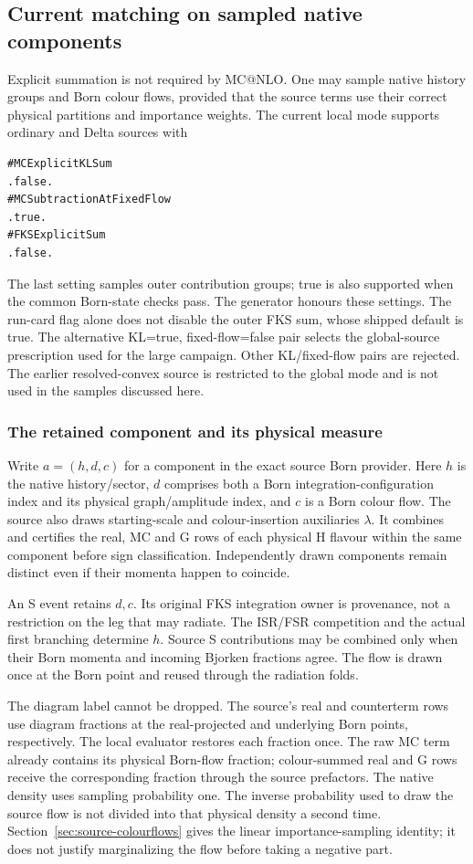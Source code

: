 \subsection{Current matching on sampled native components}
\label{sec:delta-sampled}

Explicit summation is not required by MC@NLO. One may sample native
history groups and Born colour flows, provided that the source terms
use their correct physical partitions and importance weights. The
current local mode supports ordinary and Delta sources with
\begin{verbatim}
#MCExplicitKLSum
.false.
#MCSubtractionAtFixedFlow
.true.
#FKSExplicitSum
.false.
\end{verbatim}
The last setting samples outer contribution groups; true is also
supported when the common Born-state checks pass. The generator honours
these settings. The run-card flag alone does not disable the outer FKS
sum, whose shipped default is true. The alternative KL=true,
fixed-flow=false pair selects the global-source prescription used for
the large campaign. Other KL/fixed-flow pairs are rejected. The earlier
resolved-convex source is restricted to the global mode and is not used
in the samples discussed here.

\subsubsection{The retained component and its physical measure}

Write $a=(h,d,c)$ for a component in the exact source Born provider.
Here $h$ is the native history/sector, $d$ comprises both a Born
integration-configuration index and its physical graph/amplitude index,
and $c$ is a Born colour flow. The source also draws starting-scale
and colour-insertion auxiliaries $\lambda$. It combines and certifies
the real, MC and G rows of each physical H flavour within the same
component before sign classification. Independently drawn components
remain distinct even if their momenta happen to coincide.

An S event retains $d,c$. Its original FKS integration owner is
provenance, not a restriction on the leg that may radiate. The ISR/FSR
competition and the actual first branching determine $h$. Source S
contributions may be combined only when their Born momenta and incoming
Bjorken fractions agree. The flow is drawn once at the Born point and
reused through the radiation folds.

The diagram label cannot be dropped. The source's real and counterterm
rows use diagram fractions at the real-projected and underlying Born
points, respectively. The local evaluator restores each fraction once.
The raw MC term already contains its physical Born-flow fraction;
colour-summed real and G rows receive the corresponding fraction through
the source prefactors. The native density uses sampling probability one.
The inverse probability used to draw the source flow is not divided
into that physical density a second time. Section~\ref{sec:source-colourflows}
gives the linear importance-sampling identity; it does not justify
marginalizing the flow before taking a negative part.

